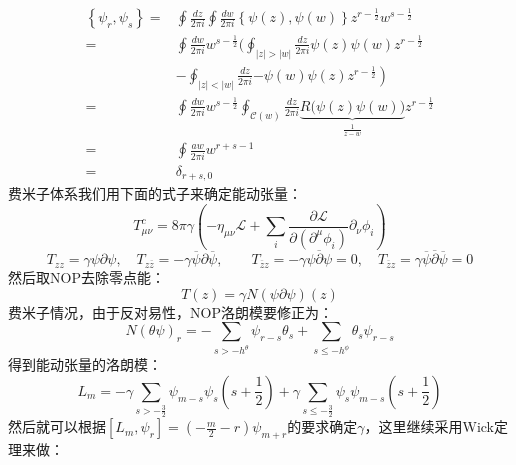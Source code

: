 \begin{equation}
	\begin{aligned}
		\left\{\psi_{r},\psi_{s}\right\}=&\oint\frac{dz}{2\pi i}\oint\frac{dw}{2\pi i}\left\{\psi(z),\psi(w)\right\}z^{r-\frac{1}{2}}w^{s-\frac{1}{2}} \\
		=&\oint\frac{dw}{2\pi i}w^{s-\frac12}\Big(\oint_{|z|>|w|}\frac{dz}{2\pi i}\psi(z)\psi(w)z^{r-\frac12} \\
		&-\oint_{|z|<|w|}\frac{dz}{2\pi i}\left.-\psi(w)\psi(z)z^{r-\frac12}\right) \\
		=&\oint\frac{dw}{2\pi i}w^{s-\frac12}\oint_{\mathcal{C}(w)}\frac{dz}{2\pi i}\underbrace{R\big(\psi(z)\psi(w)\big)}_{\frac{1}{z-w}}z^{r-\frac12} \\
		=&\oint\frac{aw}{2\pi i}w^{r+s-1} \\
		=&\delta_{r+s,0}
	\end{aligned}
\end{equation}
费米子体系我们用下面的式子来确定能动张量：
\begin{equation}
	T_{\mu\nu}^c=8\pi\left.\gamma\left(-\eta_{\mu\nu}\mathcal{L}+\sum_i\frac{\partial\mathcal{L}}{\partial\left(\partial^\mu\phi_i\right)}\partial_\nu\phi_i\right)\right. 
\end{equation}
\begin{equation}
	T_{zz}=\gamma\psi\partial\psi,\quad T_{z\overline{z}}=-\gamma\overline{\psi}\partial\overline{\psi},\quad\quad T_{\overline{z}z}=-\gamma\psi\overline{\partial}\psi=0,\quad T_{\overline{z}z}=\gamma\overline{\psi}\overline{\partial}\overline{\psi}=0
\end{equation}
然后取NOP去除零点能：
\begin{equation}
	T(z)=\gamma N\left(\psi\partial\psi\right)(z)
\end{equation}
费米子情况，由于反对易性，NOP洛朗模要修正为：
\begin{equation}\label{eq:35.48}
	\boxed{
		N\left(\theta\psi\right)_r=-\sum_{s>-h^\theta}\psi_{r-s}\theta_s+\sum_{s\leq-h^\phi}\theta_s\psi_{r-s}
	}
\end{equation}
得到能动张量的洛朗模：
\begin{equation}\label{35.49}
	L_m=-\gamma\sum_{s>-\frac32}\psi_{m-s}\psi_s\left(s+\frac12\right)+\gamma\sum_{s\leq-\frac32}\psi_s\psi_{m-s}\left(s+\frac12\right)
\end{equation}
然后就可以根据$\left[L_m,\psi_r\right]=\left(-\frac m2-r\right)\psi_{m+r}$的要求确定$\gamma$，这里继续采用Wick定理来做：
